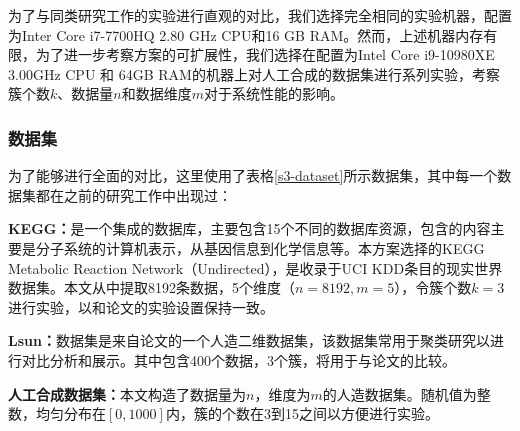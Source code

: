 为了与同类研究工作\cite{wu2020secure,mohassel2019practical}的实验进行直观的对比，我们选择完全相同的实验机器，配置为Inter Core i7-7700HQ 2.80 GHz CPU和16 GB RAM。然而，上述机器内存有限，为了进一步考察方案的可扩展性，我们选择在配置为Intel Core i9-10980XE 3.00GHz CPU 和 64GB RAM的机器上对人工合成的数据集进行系列实验，考察簇个数$k$、数据量$n$和数据维度$m$对于系统性能的影响。
\subsubsection{数据集}
\begin{table}[htbp]
	\centering
	\renewcommand{\arraystretch}{1.3}
	\caption{数据集详细信息}
	\label{s3-dataset}
\end{table}
为了能够进行全面的对比，这里使用了表格\ref{s3-dataset}所示数据集，其中每一个数据集都在之前的研究工作中出现过：
\begin{compactitem}
	\item \textbf{KEGG：}是一个集成的数据库，主要包含15个不同的数据库资源，包含的内容主要是分子系统的计算机表示，从基因信息到化学信息等。本方案选择的KEGG Metabolic Reaction Network（Undirected），是收录于UCI KDD条目的现实世界数据集\cite{naeem2011kegg}。本文从中提取8192条数据，5个维度（$ n=8192,m=5 $），令簇个数$ k=3 $进行实验，以和论文\cite{wu2020secure}的实验设置保持一致。
	\item \textbf{Lsun：}数据集是来自论文\cite{franti2018k}的一个人造二维数据集，该数据集常用于聚类研究以进行对比分析和展示。其中包含400个数据，3个簇，将用于与论文\cite{jaschke2019unsupervised}的比较。
	\item \textbf{人工合成数据集：}本文构造了数据量为$ n $，维度为$ m $的人造数据集。随机值为整数，均匀分布在$ [0,1000] $内，簇的个数在3到15之间以方便进行实验。
\end{compactitem}

